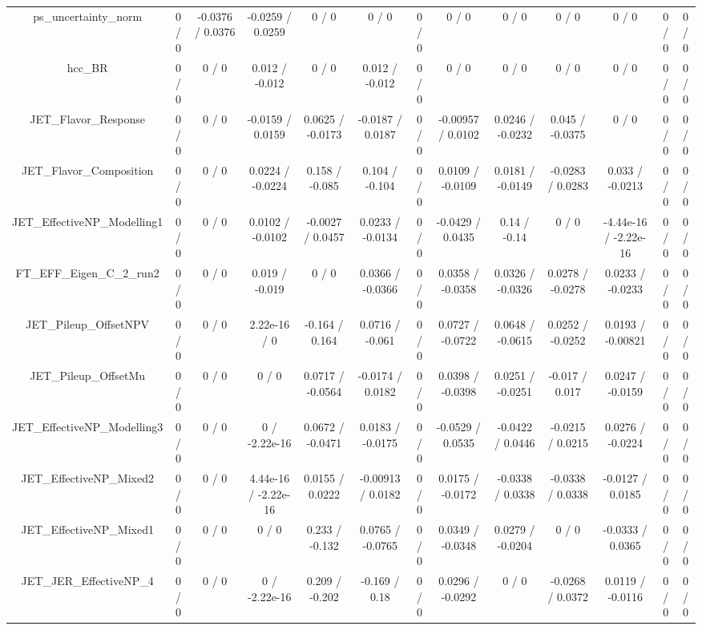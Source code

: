 \documentclass[10pt]{article}
\begin{document}
\begin{table}[htbp]
\begin{center}
\begin{tabular}{|c|c|c|c|c|c|c|c|c|c|c|c|c|}
  ps_uncertainty_norm & 0 / 0 & -0.0376 / 0.0376 & -0.0259 / 0.0259 & 0 / 0 & 0 / 0 & 0 / 0 & 0 / 0 & 0 / 0 & 0 / 0 & 0 / 0 & 0 / 0 & 0 / 0 \\ 
  hcc_BR & 0 / 0 & 0 / 0 & 0.012 / -0.012 & 0 / 0 & 0.012 / -0.012 & 0 / 0 & 0 / 0 & 0 / 0 & 0 / 0 & 0 / 0 & 0 / 0 & 0 / 0 \\ 
  JET_Flavor_Response & 0 / 0 & 0 / 0 & -0.0159 / 0.0159 & 0.0625 / -0.0173 & -0.0187 / 0.0187 & 0 / 0 & -0.00957 / 0.0102 & 0.0246 / -0.0232 & 0.045 / -0.0375 & 0 / 0 & 0 / 0 & 0 / 0 \\ 
  JET_Flavor_Composition & 0 / 0 & 0 / 0 & 0.0224 / -0.0224 & 0.158 / -0.085 & 0.104 / -0.104 & 0 / 0 & 0.0109 / -0.0109 & 0.0181 / -0.0149 & -0.0283 / 0.0283 & 0.033 / -0.0213 & 0 / 0 & 0 / 0 \\ 
  JET_EffectiveNP_Modelling1 & 0 / 0 & 0 / 0 & 0.0102 / -0.0102 & -0.0027 / 0.0457 & 0.0233 / -0.0134 & 0 / 0 & -0.0429 / 0.0435 & 0.14 / -0.14 & 0 / 0 & -4.44e-16 / -2.22e-16 & 0 / 0 & 0 / 0 \\ 
  FT_EFF_Eigen_C_2_run2 & 0 / 0 & 0 / 0 & 0.019 / -0.019 & 0 / 0 & 0.0366 / -0.0366 & 0 / 0 & 0.0358 / -0.0358 & 0.0326 / -0.0326 & 0.0278 / -0.0278 & 0.0233 / -0.0233 & 0 / 0 & 0 / 0 \\ 
  JET_Pileup_OffsetNPV & 0 / 0 & 0 / 0 & 2.22e-16 / 0 & -0.164 / 0.164 & 0.0716 / -0.061 & 0 / 0 & 0.0727 / -0.0722 & 0.0648 / -0.0615 & 0.0252 / -0.0252 & 0.0193 / -0.00821 & 0 / 0 & 0 / 0 \\ 
  JET_Pileup_OffsetMu & 0 / 0 & 0 / 0 & 0 / 0 & 0.0717 / -0.0564 & -0.0174 / 0.0182 & 0 / 0 & 0.0398 / -0.0398 & 0.0251 / -0.0251 & -0.017 / 0.017 & 0.0247 / -0.0159 & 0 / 0 & 0 / 0 \\ 
  JET_EffectiveNP_Modelling3 & 0 / 0 & 0 / 0 & 0 / -2.22e-16 & 0.0672 / -0.0471 & 0.0183 / -0.0175 & 0 / 0 & -0.0529 / 0.0535 & -0.0422 / 0.0446 & -0.0215 / 0.0215 & 0.0276 / -0.0224 & 0 / 0 & 0 / 0 \\ 
  JET_EffectiveNP_Mixed2 & 0 / 0 & 0 / 0 & 4.44e-16 / -2.22e-16 & 0.0155 / 0.0222 & -0.00913 / 0.0182 & 0 / 0 & 0.0175 / -0.0172 & -0.0338 / 0.0338 & -0.0338 / 0.0338 & -0.0127 / 0.0185 & 0 / 0 & 0 / 0 \\ 
  JET_EffectiveNP_Mixed1 & 0 / 0 & 0 / 0 & 0 / 0 & 0.233 / -0.132 & 0.0765 / -0.0765 & 0 / 0 & 0.0349 / -0.0348 & 0.0279 / -0.0204 & 0 / 0 & -0.0333 / 0.0365 & 0 / 0 & 0 / 0 \\ 
  JET_JER_EffectiveNP_4 & 0 / 0 & 0 / 0 & 0 / -2.22e-16 & 0.209 / -0.202 & -0.169 / 0.18 & 0 / 0 & 0.0296 / -0.0292 & 0 / 0 & -0.0268 / 0.0372 & 0.0119 / -0.0116 & 0 / 0 & 0 / 0 \\ 

\end{tabular}
\end{center}
\end{table}
\end{document}
